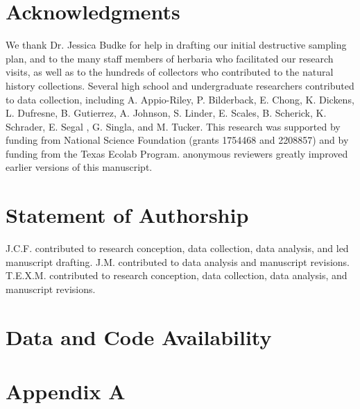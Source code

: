 \documentclass[11pt]{article}
\newcommand{\secondrevise}[1]{{\color{black}{#1}}}
\begin{document}
	\section*{Acknowledgments}
	We thank Dr. Jessica Budke for help in drafting our initial destructive sampling plan, and to the many staff members of herbaria who facilitated our research visits, as well as to the hundreds of collectors who contributed to the natural history collections. 
	Several high school and undergraduate researchers contributed to data collection, including A. Appio-Riley, P. Bilderback, E. Chong, K. Dickens, L. Dufresne, B. Gutierrez, A. Johnson, S. Linder, E. Scales, B. Scherick, K. Schrader, E. Segal , G. Singla, and M. Tucker.
	This research was supported by funding from National Science Foundation (grants 1754468 and 2208857) and by funding from the Texas Ecolab Program.
	\secondrevise{Four} anonymous reviewers greatly improved earlier versions of this manuscript.


	
	\section*{Statement of Authorship}
J.C.F. contributed to research conception, data collection, data analysis, and led manuscript drafting.
J.M. contributed to data analysis and manuscript revisions.
T.E.X.M. contributed to research conception, data collection, data analysis, and manuscript revisions.

	
	\section*{Data and Code Availability}
\newpage{}
	
	
	
\newpage{}


	\section*{Appendix A}
	
\end{document}
